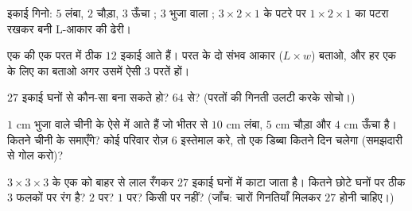 \begin{exercise}[$\star$]\label{exo:g5:solids:6}
इकाई  गिनो: $5$ लंबा, $2$ चौड़ा, $3$ ऊँचा ; $3$ भुजा
वाला ; $3 \times 2 \times 1$ के पटरे पर $1 \times 2 \times 1$
का पटरा रखकर बनी L-आकार की ढेरी।
\end{exercise}

\begin{exercise}[$\star$]\label{exo:g5:solids:7}
एक  की एक परत में ठीक $12$ इकाई  आते हैं। परत के दो संभव
आकार ($L \times w$) बताओ, और हर एक के लिए  का  बताओ अगर
उसमें ऐसी $3$ परतें हों।
\end{exercise}

\begin{exercise}[$\star$]\label{exo:g5:solids:8}
$27$ इकाई घनों से कौन-सा  बना सकते हो? $64$ से? (परतों की
गिनती उलटी करके सोचो।)
\end{exercise}

\begin{exercise}[$\star\star$]\label{exo:g5:solids:9}
$1$ cm भुजा वाले चीनी के  ऐसे  में आते हैं जो भीतर से
$10$ cm लंबा, $5$ cm चौड़ा और $4$ cm ऊँचा है। कितने चीनी के 
समाएँगे? कोई परिवार रोज़ $6$  इस्तेमाल करे, तो एक डिब्बा कितने
दिन चलेगा (समझदारी से गोल करो)?
\end{exercise}

\begin{exercise}[$\star\star$]\label{exo:g5:solids:10}
$3 \times 3 \times 3$ के एक  को बाहर से लाल रँगकर $27$ इकाई
घनों में काटा जाता है। कितने छोटे घनों पर ठीक $3$ फलकों पर रंग
है? $2$ पर? $1$ पर? किसी पर नहीं? (जाँच: चारों गिनतियाँ मिलकर
$27$ होनी चाहिए।)
\end{exercise}
